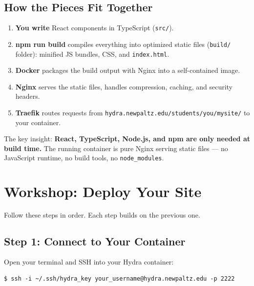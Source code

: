 \documentclass[11pt, letterpaper]{article}
\begin{document}
\subsection{How the Pieces Fit Together}

\begin{enumerate}
  \item \textbf{You write} React components in TypeScript (\texttt{src/}).
  \item \textbf{npm run build} compiles everything into optimized static files
        (\texttt{build/} folder): minified JS bundles, CSS, and
        \texttt{index.html}.
  \item \textbf{Docker} packages the build output with Nginx into a
        self-contained image.
  \item \textbf{Nginx} serves the static files, handles compression, caching,
        and security headers.
  \item \textbf{Traefik} routes requests from
        \texttt{hydra.newpaltz.edu/students/you/mysite/} to your container.
\end{enumerate}

The key insight: \textbf{React, TypeScript, Node.js, and npm are only needed
at build time.} The running container is pure Nginx serving static files ---
no JavaScript runtime, no build tools, no \texttt{node\_modules}.

\section{Workshop: Deploy Your Site}

Follow these steps in order. Each step builds on the previous one.

\subsection{Step 1: Connect to Your Container}

Open your terminal and SSH into your Hydra container:

\begin{lstlisting}[style=terminal]
$ ssh -i ~/.ssh/hydra_key your_username@hydra.newpaltz.edu -p 2222
\end{lstlisting}
\end{document}
